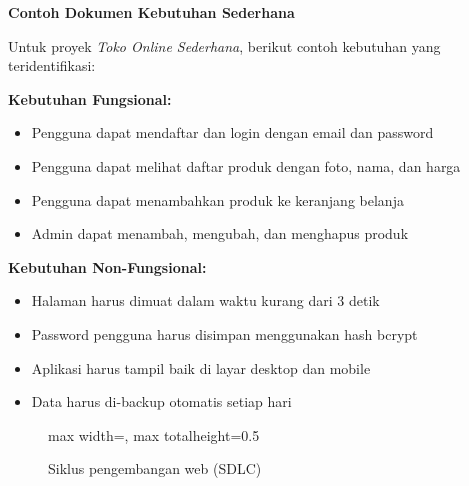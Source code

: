 \begin{contoh}
\textbf{Contoh Dokumen Kebutuhan Sederhana}

Untuk proyek \textit{Toko Online Sederhana}, berikut contoh kebutuhan yang teridentifikasi:

\textbf{Kebutuhan Fungsional:}
\begin{itemize}
  \item Pengguna dapat mendaftar dan login dengan email dan password
  \item Pengguna dapat melihat daftar produk dengan foto, nama, dan harga
  \item Pengguna dapat menambahkan produk ke keranjang belanja
  \item Admin dapat menambah, mengubah, dan menghapus produk
\end{itemize}

\textbf{Kebutuhan Non-Fungsional:}
\begin{itemize}
  \item Halaman harus dimuat dalam waktu kurang dari 3 detik
  \item Password pengguna harus disimpan menggunakan hash bcrypt
  \item Aplikasi harus tampil baik di layar desktop dan mobile
  \item Data harus di-backup otomatis setiap hari
\end{itemize}
\end{contoh}

\begin{figure}[H]
\centering
\begin{adjustbox}{max width=\textwidth, max totalheight=0.5\textheight}
\end{adjustbox}
\caption{Siklus pengembangan web (SDLC)}
\end{figure}


